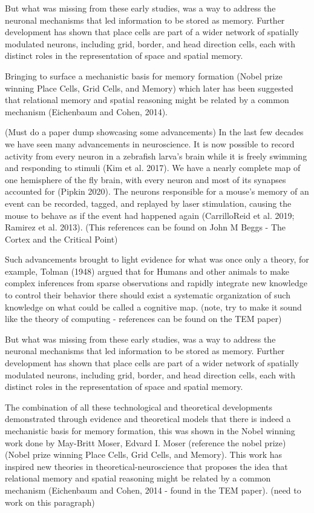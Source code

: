\documentclass{article}
\begin{document}
But what was missing from these early studies, was a way to address the neuronal mechanisms that led information to be stored as memory. Further development has shown that place cells are part of a wider network of spatially modulated neurons, including grid, border, and head direction cells, each with distinct roles in the representation of space and spatial memory.

Bringing to surface a mechanistic basis for memory formation (Nobel prize winning Place Cells, Grid Cells, and Memory) which later has been suggested that relational memory and spatial reasoning might be related by a common mechanism (Eichenbaum and Cohen, 2014).


\cite{beiran2023parametric}


(Must do a paper dump showcasing some advancements)
In the last few decades we have seen many advancements in neuroscience. It is now possible to record activity from every neuron in a zebrafish larva’s brain while it is freely swimming and responding to stimuli (Kim et al. 2017). We have a nearly complete map of one hemisphere of the fly brain, with every neuron and most of its synapses accounted for (Pipkin 2020). The neurons responsible for a mouse’s memory of an event can be recorded, tagged, and replayed by laser stimulation, causing the mouse to behave as if the event had happened again (CarrilloReid et al. 2019; Ramirez et al. 2013). (This references can be found on John M Beggs - The Cortex and the Critical Point)

Such advancements brought to light evidence for what was once only a theory, for example, Tolman (1948) argued that for Humans and other animals to make complex inferences from sparse observations and rapidly integrate new knowledge to control their behavior there should exist a systematic organization of such knowledge on what could be called a cognitive map. (note, try to make it sound like the theory of computing - references can be found on the TEM paper)

But what was missing from these early studies, was a way to address the neuronal mechanisms that led information to be stored as memory. Further development has shown that place cells are part of a wider network of spatially modulated neurons, including grid, border, and head direction cells, each with distinct roles in the representation of space and spatial memory.

The combination of all these technological and theoretical developments demonstrated through evidence and theoretical models that there is indeed a mechanistic basis for memory formation, this was shown in the Nobel winning work done by May-Britt Moser, Edvard I. Moser (reference the nobel prize)(Nobel prize winning Place Cells, Grid Cells, and Memory). This work has inspired new theories in theoretical-neuroscience that proposes the idea that relational memory and spatial reasoning might be related by a common mechanism (Eichenbaum and Cohen, 2014 - found in the TEM paper). (need to work on this paragraph)
\end{document}
